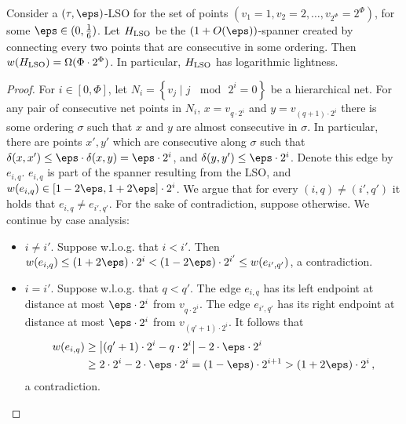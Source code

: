 \begin{lemma}\label{lem:LSO}
Consider a $(\tau,\eps)$-LSO for the set of points $\left(v_1=1,v_2=2,\dots,v_{2^\Phi}=2^\Phi\right)$, 
for some $\eps\in(0,\frac{1}{6})$. Let $H_{{\rm LSO}}$ be the $(1+O(\eps))$-spanner
created by connecting every two points that are consecutive in some
ordering. Then $w(H_{{\rm LSO}})=\Omega(\Phi\cdot2^{\Phi})$. In particular,
$H_{{\rm LSO}}$ has logarithmic lightness.
\end{lemma}
\begin{proof}
For $i\in[0,\Phi]$, let $N_{i}=\left\{ v_{j}\mid j\,\mod\,2^{i}=0\right\} $
be a hierarchical net. For any pair of consecutive net points in $N_{i}$,
$x=v_{q\cdot2^{i}}$ and $y=v_{(q+1)\cdot2^{i}}$ there is some ordering
$\sigma$ such that $x$ and $y$ are almost consecutive in $\sigma$.
In particular, there are points $x',y'$ which are consecutive along
$\sigma$ such that $\delta(x,x')\le\eps\cdot\delta(x,y)=\eps\cdot2^{i}$,
and $\delta(y,y')\le\eps\cdot2^{i}$. Denote this edge by $e_{i,q}$.
$e_{i,q}$ is part of the spanner resulting from the LSO, and $w(e_{i,q})\in\left[1-2\eps,1+2\eps\right]\cdot2^{i}$. 
%
We argue that for every $(i,q)\ne(i',q')$ it holds that $e_{i,q}\ne e_{i',q'}$.
For the sake of contradiction, suppose otherwise. We continue by case
analysis:
\begin{itemize}
\item $i\ne i'$. Suppose w.l.o.g. that $i<i'$. Then $w(e_{i,q})\le(1+2\eps)\cdot2^{i}<(1-2\eps)\cdot2^{i'}\le w(e_{i',q'})$,
a contradiction.
\item $i=i'$. Suppose w.l.o.g. that $q<q'$. The edge $e_{i,q}$ has its
left endpoint at distance at most $\eps\cdot2^{i}$ from $v_{q\cdot2^{i}}$.
The edge $e_{i',q'}$ has its right endpoint at distance at most $\eps\cdot2^{i}$
from $v_{(q'+1)\cdot2^{i}}$. It follows that 
\begin{align*}
w(e_{i,q}) & \ge\left|(q'+1)\cdot2^{i}-q\cdot2^{i}\right|-2\cdot\eps\cdot2^{i}\\
 & \ge2\cdot2^{i}-2\cdot\eps\cdot2^{i}=(1-\eps)\cdot2^{i+1}>(1+2\eps)\cdot2^{i}\,,
\end{align*}
a contradiction.\aftermath
\end{itemize}
\end{proof}
%
